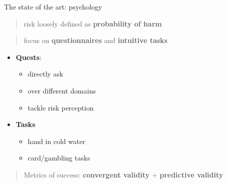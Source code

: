 \documentclass[
  ignorenonframetext,
]{beamer}
\providecommand{\tightlist}{%
  \setlength{\itemsep}{0pt}\setlength{\parskip}{0pt}}
\begin{document}
\begin{frame}{The state of the art: psychology}
\protect\hypertarget{the-state-of-the-art-psychology}{}

\begin{quote}
risk loosely defined as \textbf{probability of harm}
\end{quote}

\begin{quote}
focus on \textbf{questionnaires} and \textbf{intuitive tasks}
\end{quote}

\begin{itemize}
\tightlist
\item
  \textbf{Quests}:

  \begin{itemize}
  \tightlist
  \item
    directly ask
  \item
    over different domains
  \item
    tackle risk perception
  \end{itemize}
\item
  \textbf{Tasks}

  \begin{itemize}
  \tightlist
  \item
    hand in cold water
  \item
    card/gambling tasks
  \end{itemize}
\end{itemize}

\begin{quote}
Metrics of success: \textbf{convergent validity} + \textbf{predictive
validity}
\end{quote}

\end{frame}
\end{document}
